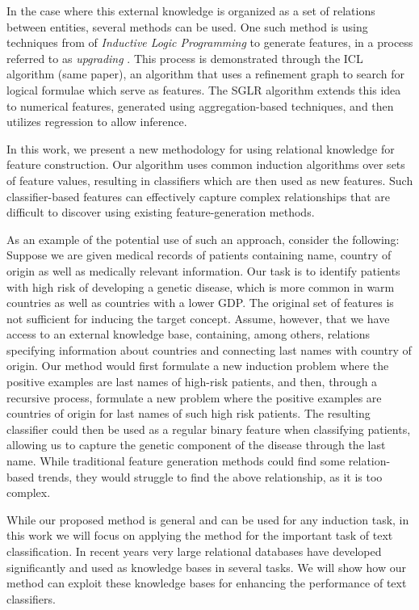\documentclass[12pt, a4paper]{article}
\theoremstyle{definition}
\begin{document}
In the case where this external knowledge is organized as a set of relations between entities, several methods can be used. One such method is using techniques from of \emph{Inductive Logic Programming} \citep{muggleton1991inductive} to generate features, in a process referred to as \emph{upgrading} \citep{van2001upgrade}. This process is demonstrated through the ICL algorithm (same paper), an algorithm that uses a refinement graph to search for logical formulae which serve as features. The SGLR algorithm \citep{popescul200716} extends this idea to numerical features, generated using aggregation-based techniques, and then utilizes regression to allow inference.

In this work, we present a new methodology for using relational knowledge for feature construction.  Our algorithm uses common induction algorithms over sets of feature values, resulting in classifiers which are then used as new features.
Such classifier-based features can effectively capture complex relationships that are difficult to discover using existing feature-generation methods.

As an example of the potential use of such an approach, consider the following:
Suppose we are given medical records of patients containing name, country of origin as well as medically relevant information.
Our task is to identify patients with high risk of developing a genetic disease, which is more common in warm countries as well as countries with a lower GDP.
The original set of features is not sufficient for inducing the target concept.  Assume, however, that we have access to an external knowledge base, containing, among others, relations specifying information about countries and connecting last names with country of origin.
Our method would first formulate a new induction problem where the positive examples are last names of high-risk patients, and then, through a recursive process, formulate a new problem where the positive examples are countries of origin for last names of such high risk patients. The resulting classifier could then be used as a regular binary feature when classifying patients, allowing us to capture the genetic component of the disease through the last name.
While traditional feature generation methods could find some relation-based trends, they would struggle to find the above relationship, as it is too complex.


While our proposed method is general and can be used for any induction task, in this work we will focus on applying the method for the important task of text classification. In recent years very large relational databases have developed significantly and used as knowledge bases in several tasks. We will show how our method can exploit these knowledge bases for enhancing the performance of text classifiers.
\end{document}
